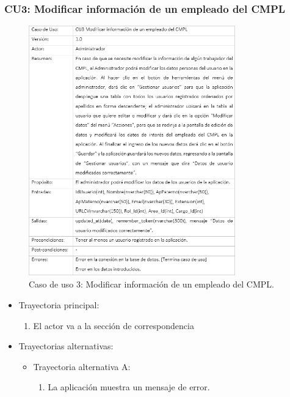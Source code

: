 		\subsubsection{CU3: Modificar información de un empleado del CMPL}
			\begin{figure}[htbp!]
				\centering
					\includegraphics[width=0.8\textwidth]{images/CU/CU3}
					\caption{Caso de uso 3: Modificar información de un empleado del CMPL.}
				\label{Tabla}
			\end{figure}
			
			\begin{itemize}
				\item Trayectoria principal:
					\begin{enumerate}
						\item El actor va a la sección de correspondencia 
					\end{enumerate}
				\item Trayectorias alternativas:
					\begin{itemize}
						\item Trayectoria alternativa A:
							\begin{enumerate}
								\item La aplicación muestra un mensaje de error.
							\end{enumerate}
					\end{itemize}
			\end{itemize}
		
